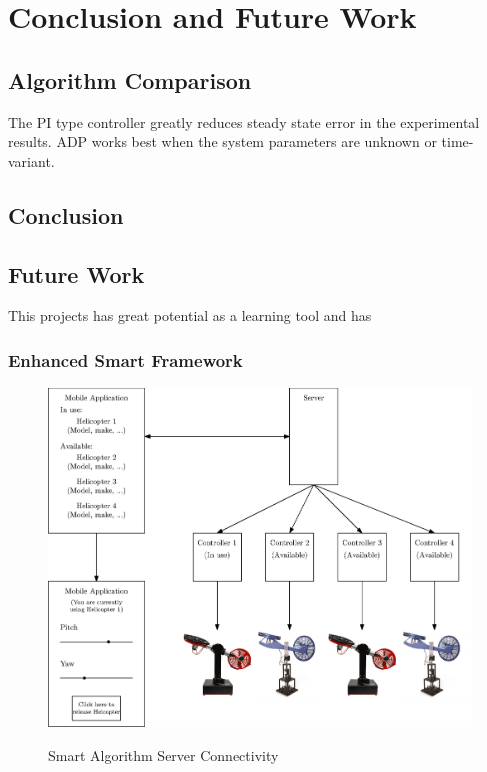 \chapter{Conclusion and Future Work}
\label{ch: Chapter6}

\section{Algorithm Comparison}
The PI type controller greatly reduces steady state error in the experimental results.  ADP works best when the system parameters are unknown or time-variant.

\section{Conclusion}

\section{Future Work}
This projects has great potential as a learning tool and has 

\subsection{Enhanced Smart Framework}

\begin{figure}[!htbp]
    \centering
    \includegraphics[width=.46\textwidth,keepaspectratio=true]{figs/ipe/smartAlg.eps}
    \label{fig:Smart_Alg}
    \caption{Smart Algorithm Server Connectivity}
\end{figure}

